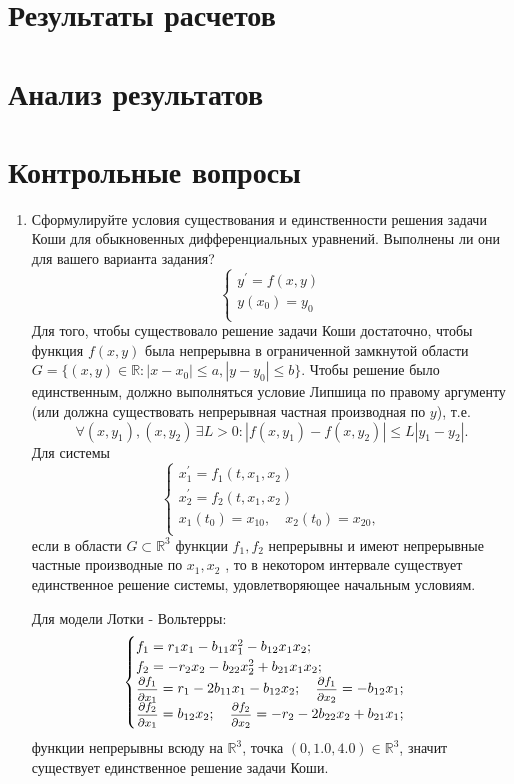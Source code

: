 \documentclass[12pt, a4paper]{article}
\begin{document}
\section{Результаты расчетов}
\newpage

\section{Анализ результатов}
\newpage

\section{Контрольные вопросы}
\begin{enumerate}
\item Сформулируйте условия существования и единственности решения задачи Коши для обыкновенных дифференциальных уравнений. Выполнены ли они для вашего варианта задания?
\begin{equation*}
\begin{cases}
y^{'} = f(x,y)\\
y(x_0) = y_0\\
\end{cases}
\end{equation*}
Для того, чтобы существовало решение задачи Коши достаточно, чтобы функция $f(x,y)$ была непрерывна в ограниченной замкнутой области $G = \{(x,y) \in \mathbb{R}\colon |x - x_0|\leq a, |y - y_0|\leq b\}$. Чтобы решение было единственным, должно выполняться условие Липшица по правому аргументу (или должна существовать непрерывная частная производная по $y$), т.е.
\[
\forall (x,y_1), (x,y_2)\, \exists L>0 \colon |f(x,y_1) - f(x,y_2)|\leq L|y_1 - y_2|.
\] 
Для системы
\begin{equation*}
\begin{cases}
x_1^{'} = f_1(t,x_1,x_2)\\
x_2^{'} = f_2(t,x_1,x_2)\\
x_1(t_0) =x_{10},\quad x_2(t_0) = x_{20}, \\
\end{cases}
\end{equation*}
если в области $G \subset \mathbb{R}^3$ функции $f_1,f_2$  непрерывны и имеют непрерывные частные производные по $x_1, x_2$ , то в некотором интервале  существует единственное решение системы, удовлетворяющее начальным условиям.

Для модели Лотки - Вольтерры:
\begin{equation*}
\begin{cases}
f_1 =r_1x_1 - b_{11}x_1^2-b_{12}x_1x_2;\\
f_2 =-r_2x_2-b_{22}x_2^2+b_{21}x_1x_2;\\
\hbox{\footnotesize$\displaystyle\frac{\partial f_1}{\partial x_1}$} = r_1 - 2b_{11}x_1 - b_{12}x_2;\quad
\hbox{\footnotesize$\displaystyle\frac{\partial f_1}{\partial x_2}$} = -b_{12}x_1;\\
\hbox{\footnotesize$\displaystyle\frac{\partial f_2}{\partial x_1}$} =b_{12}x_2;\quad
\hbox{\footnotesize$\displaystyle\frac{\partial f_2}{\partial x_2}$} =-r_2 - 2b_{22}x_2 + b_{21}x_1;\\
\end{cases}
\end{equation*}
функции непрерывны всюду на $\mathbb{R}^3$, точка $(0, 1{.}0, 4{.}0) \in \mathbb{R}^3$, значит существует единственное решение задачи Коши.



\end{enumerate}
\end{document}
